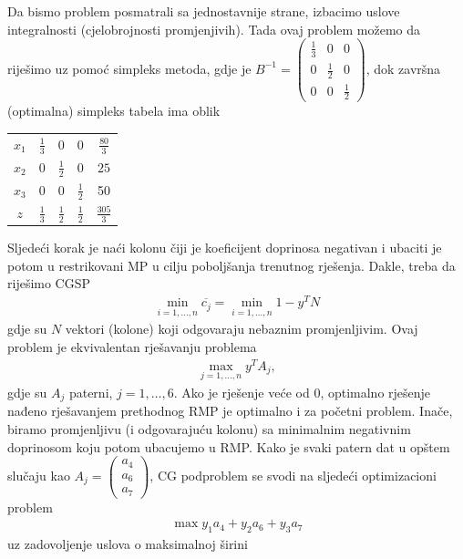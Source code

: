 \documentclass[b5paper, utf8, 11pt, colorlinks]{book}
\theoremstyle{definition}
\begin{document}
Da bismo  problem posmatrali sa jednostavnije strane, izbacimo uslove integralnosti (cjelobrojnosti promjenjivih). Tada ovaj problem možemo da riješimo uz pomoć simpleks metoda, gdje je 
$B^{-1} =\begin{pmatrix}
	    \frac{1}{3} & 0 & 0 \\
	    0 & \frac{1}{2} & 0  \\
	    0 &   0 & \frac{1}{2}
\end{pmatrix}$, dok završna (optimalna) simpleks tabela ima oblik 

\begin{center}
 
\begin{tabular}{cccc|c}
	  $x_1$ &     $\frac{1}{3}$  &   0 & 0  & $\frac{80}{3}$ \\
	  $x_2$ &     0              &  $\frac{1}{2}$  & 0 & $25$ \\
	  $x_3$ &     0              &  0    &  $\frac{1}{2}$  & 50 \\ \hline
	  $z$   &  $\frac{1}{3}$     &  $\frac{1}{2}$   &  $\frac{1}{2}$ & $\frac{305}{3}$ 
\end{tabular}
\end{center}
Sljedeći korak je naći kolonu čiji je koeficijent doprinosa negativan i ubaciti je potom u restrikovani MP u cilju poboljšanja trenutnog rješenja. Dakle, treba da riješimo CGSP
\begin{align}
	\min_{i=1,\ldots,n} \overline{c_j} = \min_{i=1,\ldots,n} 1 - y^T N
\end{align}
gdje su $N$ vektori (kolone) koji odgovaraju nebaznim promjenljivim. Ovaj problem je ekvivalentan rješavanju problema
\begin{align}
	\max_{j=1,\ldots,n} y^T A_j,
\end{align}
gdje su $A_j$ paterni, $j=1,\ldots, 6$. 
Ako je rješenje veće od 0, optimalno rješenje nađeno rješavanjem prethodnog RMP je optimalno i za početni problem. Inače, biramo promjenljivu (i odgovarajuću kolonu) sa minimalnim negativnim doprinosom koju potom ubacujemo u RMP. Kako je svaki patern dat u opštem slučaju kao $A_j = \begin{pmatrix}
	a_4 \\
	a_6 \\
	a_7
\end{pmatrix}$, CG podproblem se svodi na sljedeći optimizacioni problem
\begin{align}
	 \max y_1 a_4 + y_2 a_6 + y_3 a_7  
\end{align}
uz zadovoljenje uslova o maksimalnoj širini
\end{document}
